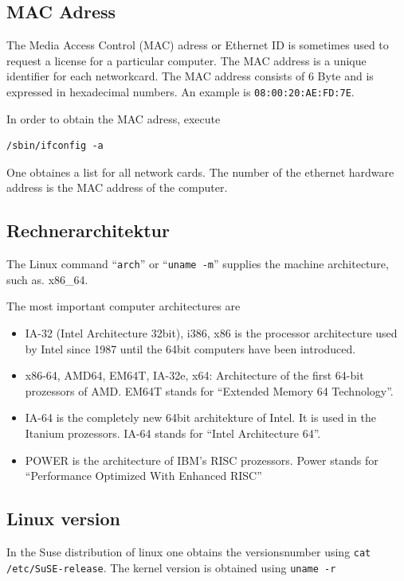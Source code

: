 \documentclass[a4paper,10pt]{report}
\newcommand{\mytt}[1]{{\tt #1}}
\begin{document}
\subsection{MAC Adress}

The Media Access Control (MAC) adress or Ethernet ID is sometimes used
to request a license for a particular computer. The MAC address is a
unique identifier for each networkcard. The MAC address consists of 6
Byte and is expressed in hexadecimal numbers.  An example is
\mytt{08:00:20:AE:FD:7E}.

In order to obtain the  MAC adress, execute
\begin{verbatim}
/sbin/ifconfig -a
\end{verbatim}
One obtaines a list for all network cards. The number of the ethernet
hardware address is the MAC address of the computer.

\subsection{Rechnerarchitektur}
The Linux command ``\mytt{arch}'' or ``\mytt{uname -m}'' supplies the
machine architecture, such as. x86\_64.

The most important computer architectures are
\begin{itemize}
\item IA-32 (Intel Architecture 32bit), i386, x86 is the processor
architecture used by Intel since 1987 until the 64bit computers have
been introduced.
\item x86-64, AMD64, EM64T, IA-32e, x64:  Architecture of the first 64-bit
prozessors of  AMD. EM64T stands for ``Extended Memory 64 Technology''.
\item IA-64 is the completely new 64bit architekture of Intel. It is
used in the Itanium prozessors. IA-64 stands for ``Intel Architecture
64''.
\item POWER is the architecture of IBM's RISC prozessors.
Power stands for ``Performance Optimized With Enhanced RISC''
\end{itemize}

\subsection{Linux version}

In the Suse distribution of linux one obtains the versionsnumber using
\verb+cat /etc/SuSE-release+.  The kernel version is obtained using
\verb+uname -r+

\end{document}
